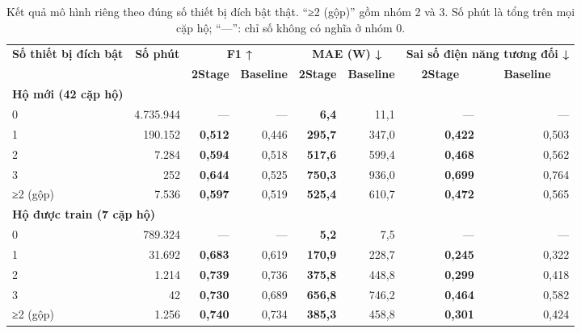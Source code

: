 \begin{table}[H]
\centering
\caption{Kết quả mô hình riêng theo đúng số thiết bị đích bật thật. “≥2 (gộp)” gồm nhóm 2 và 3. Số phút là tổng trên mọi cặp hộ; “—”: chỉ số không có nghĩa ở nhóm 0.}\label{nilm:tab8}
\footnotesize
\setlength{\tabcolsep}{3.5pt}\renewcommand{\arraystretch}{1.12}
\begin{adjustbox}{max width=\linewidth}
\begin{tabular}{|l|r|r|r|r|r|r|r|}
\hline
\multirow{2}{*}{\textbf{Số thiết bị đích bật}} & \multicolumn{1}{c|}{\multirow{2}{*}{\textbf{Số phút}}} & \multicolumn{2}{c|}{\textbf{F1 ↑}} & \multicolumn{2}{c|}{\textbf{MAE (W) ↓}} & \multicolumn{2}{c|}{\textbf{Sai số điện năng tương đối ↓}} \\ \cline{3-8}
 &  & \multicolumn{1}{c|}{\textbf{2Stage}} & \multicolumn{1}{c|}{\textbf{Baseline}} & \multicolumn{1}{c|}{\textbf{2Stage}} & \multicolumn{1}{c|}{\textbf{Baseline}} & \multicolumn{1}{c|}{\textbf{2Stage}} & \multicolumn{1}{c|}{\textbf{Baseline}} \\ \cline{1-1}
\multicolumn{8}{|l|}{\textbf{Hộ mới (42 cặp hộ)}} \\ \hline
0 & 4.735.944 & — & — & \textbf{6,4} & 11,1 & — & — \\ \hline
1 & 190.152 & \textbf{0,512} & 0,446 & \textbf{295,7} & 347,0 & \textbf{0,422} & 0,503 \\ \hline
2 & 7.284 & \textbf{0,594} & 0,518 & \textbf{517,6} & 599,4 & \textbf{0,468} & 0,562 \\ \hline
3 & 252 & \textbf{0,644} & 0,525 & \textbf{750,3} & 936,0 & \textbf{0,699} & 0,764 \\ \hline
≥2 (gộp) & 7.536 & \textbf{0,597} & 0,519 & \textbf{525,4} & 610,7 & \textbf{0,472} & 0,565 \\ \cline{1-1}
\multicolumn{8}{|l|}{\textbf{Hộ được train (7 cặp hộ)}} \\ \hline
0 & 789.324 & — & — & \textbf{5,2} & 7,5 & — & — \\ \hline
1 & 31.692 & \textbf{0,683} & 0,619 & \textbf{170,9} & 228,7 & \textbf{0,245} & 0,322 \\ \hline
2 & 1.214 & \textbf{0,739} & 0,736 & \textbf{375,8} & 448,8 & \textbf{0,299} & 0,418 \\ \hline
3 & 42 & \textbf{0,730} & 0,689 & \textbf{656,8} & 746,2 & \textbf{0,464} & 0,582 \\ \hline
≥2 (gộp) & 1.256 & \textbf{0,740} & 0,734 & \textbf{385,3} & 458,8 & \textbf{0,301} & 0,424 \\ \hline
\end{tabular}
\end{adjustbox}
\end{table}

